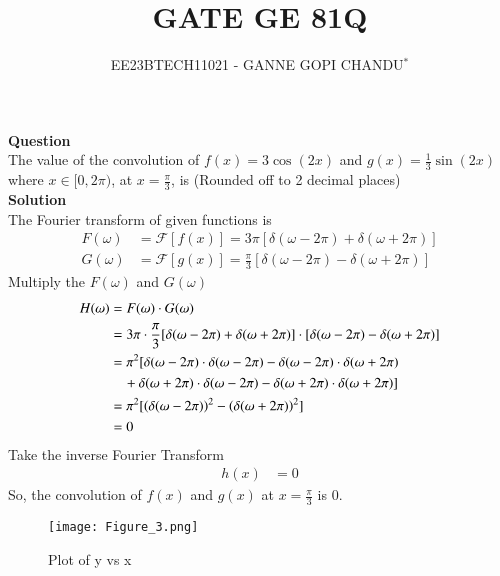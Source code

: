 \documentclass[journal,12pt,onecolumn]{IEEEtran}
\theoremstyle{remark}
\begin{document}

\vspace{3cm}
\title{GATE GE 81Q}
\author{EE23BTECH11021 - GANNE GOPI CHANDU$^{*}$%
}
\maketitle
\bigskip
\renewcommand{\thefigure}{\theenumi}
\renewcommand{\thetable}{\theenumi}

\textbf{Question}\\
The value of the convolution of $f(x) = 3\cos(2x)$ and $g(x) = \frac{1}{3}\sin(2x)$ where $x \in [0, 2\pi)$, at $x = \frac{\pi}{3}$, is (Rounded off to 2 decimal places)\\
\textbf{Solution}\\
The Fourier transform of given functions is
 \begin{align}
        F(\omega) &= \mathcal{F}[f(x)] = 3{\pi}[\delta(\omega - 2\pi) + \delta(\omega + 2\pi)] \\
        G(\omega) &= \mathcal{F}[g(x)] = \frac{\pi}{3}[\delta(\omega - 2\pi) - \delta(\omega + 2\pi)]
 \end{align}
Multiply the $F(\omega)$ and $G(\omega)$
\begin{align}
        H(\omega) &= F(\omega) \cdot G(\omega) \\
        &= 3{\pi} \cdot \frac{\pi}{3}[\delta(\omega - 2\pi) + \delta(\omega + 2\pi)] \cdot [\delta(\omega - 2\pi) - \delta(\omega + 2\pi)] \\
        &= {\pi}^2[\delta(\omega - 2\pi) \cdot \delta(\omega - 2\pi) - \delta(\omega - 2\pi) \cdot \delta(\omega + 2\pi) \\
        &\quad + \delta(\omega + 2\pi) \cdot \delta(\omega - 2\pi) - \delta(\omega + 2\pi) \cdot \delta(\omega + 2\pi)] \\
        &= {\pi}^2[\left(\delta(\omega - 2\pi)\right)^2 - \left(\delta(\omega + 2\pi)\right)^2]\\
        &=0
\end{align}
Take the inverse Fourier Transform
\begin{align}
     h(x) &= 0
\end{align}
So, the convolution of \(f(x)\) and \(g(x)\) at \(x = \frac{\pi}{3}\) is $0$.
\begin{figure}
    \centering
    \texttt{[image: Figure\_3.png]}
    \caption{Plot of y vs x}
    \label{fig:2}
\end{figure}\\
\end{document}
